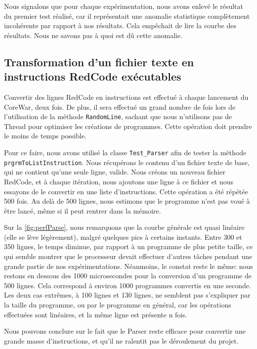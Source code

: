 \documentclass[hidelinks]{report}
\begin{document}
Nous signalons que pour chaque expérimentation, nous avons enlevé le résultat du premier test réalisé, car il représentait une anomalie statistique complètement incohérente par rapport à nos résultats. Cela empêchait de lire la courbe des résultats. Nous ne savons pas à quoi est dû cette anomalie.
\subsection{Transformation d'un fichier texte en instructions RedCode exécutables\label{subsec:perfParse}}

Convertir des lignes RedCode en instructions est effectué à chaque lancement du CoreWar, deux fois. De plus, il sera effectué un grand nombre de fois lors de l'utilisation de la méthode \texttt{RandomLine}, sachant que nous n'utilisons pas de Thread pour optimiser les créations de programmes. Cette opération doit prendre le moins de temps possible.

Pour ce faire, nous avons utilisé la classe \texttt{Test\_Parser} afin de tester la méthode \texttt{prgrmToListInstruction}. Nous récupérons le contenu d'un fichier texte de base, qui ne contient qu'une seule ligne, valide. Nous créons un nouveau fichier RedCode, et à chaque itération, nous ajoutons une ligne à ce fichier et nous essayons de le convertir en une liste d'instructions. Cette opération a été répétée 500 fois. Au delà de 500 lignes, nous estimons que le programme n'est pas voué à être lancé, même si il peut rentrer dans la mémoire.

Sur la \autoref{fig:perfParse}, nous remarquons que la courbe générale est quasi linéaire (elle se lève légèrement), malgré quelques pics à certains instants. Entre 300 et 350 lignes, le temps diminue, par rapport à un programme de plus petite taille, ce qui semble montrer que le processeur devait effectuer d'autres tâches pendant une grande partie de nos expérimentations. Néanmoins, le constat reste le même: nous restons en dessous des 1000 microsecondes pour la conversion d'un programme de 500 lignes. Cela correspond à environ 1000 programmes convertis en une seconde. Les deux cas extrêmes, à 100 lignes et 130 lignes, ne semblent pas s'expliquer par la taille du programme, ou par le programme en général, car les opérations effectuées sont linéaires, et la même ligne est présente n fois.

Nous pouvons conclure sur le fait que le Parser reste efficace pour convertir une grande masse d'instructions, et qu'il ne ralentit pas le déroulement du projet.
\end{document}
